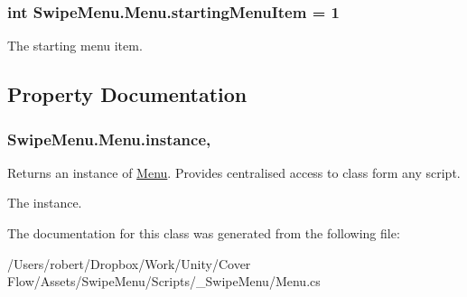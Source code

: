 \hypertarget{class_swipe_menu_1_1_menu_a4ad30893c342bb33499ddea48ab0c234}{}
\subsubsection[{starting\+Menu\+Item}]{\setlength{\rightskip}{0pt plus 5cm}int Swipe\+Menu.\+Menu.\+starting\+Menu\+Item = 1}\label{class_swipe_menu_1_1_menu_a4ad30893c342bb33499ddea48ab0c234}


The starting menu item. 



\subsection{Property Documentation}
\hypertarget{class_swipe_menu_1_1_menu_a40ef17eefa3f42dd71cdc213b42c3246}{}
\subsubsection[{instance}]{ Swipe\+Menu.\+Menu.\+instance\hspace{0.3cm}{\ttfamily [static]}, {\ttfamily [get]}}\label{class_swipe_menu_1_1_menu_a40ef17eefa3f42dd71cdc213b42c3246}


Returns an instance of \hyperlink{class_swipe_menu_1_1_menu}{Menu}. Provides centralised access to class form any script. 

The instance.

The documentation for this class was generated from the following file\+:\begin{DoxyCompactItemize}
\item 
/\+Users/robert/\+Dropbox/\+Work/\+Unity/\+Cover Flow/\+Assets/\+Swipe\+Menu/\+Scripts/\+\_\+\+Swipe\+Menu/Menu.\+cs\end{DoxyCompactItemize}
